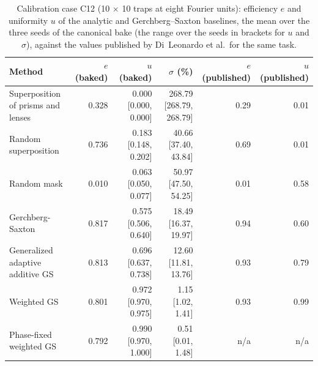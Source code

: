 \begin{table}[t]\centering\footnotesize
\caption{Calibration case C12 (10 $\times$ 10 traps at eight Fourier units): efficiency $e$ and uniformity $u$ of the analytic and Gerchberg--Saxton baselines, the mean over the three seeds of the canonical bake (the range over the seeds in brackets for $u$ and $\sigma$), against the values published by Di~Leonardo et al.\ for the same task.}\label{tab:calibration}
\begin{tabular}{@{}>{\raggedright\arraybackslash}p{} r r r r r@{}}\toprule Method & $e$ (baked) & $u$ (baked) & $\sigma$ (\%) & $e$ (published) & $u$ (published)\\\midrule
Superposition of prisms and lenses & 0.328 & 0.000 [0.000, 0.000] & 268.79 [268.79, 268.79] & 0.29 & 0.01\\
Random superposition & 0.736 & 0.183 [0.148, 0.202] & 40.66 [37.40, 43.84] & 0.69 & 0.01\\
Random mask & 0.010 & 0.063 [0.050, 0.077] & 50.97 [47.50, 54.25] & 0.01 & 0.58\\
Gerchberg-Saxton & 0.817 & 0.575 [0.506, 0.640] & 18.49 [16.37, 19.97] & 0.94 & 0.60\\
Generalized adaptive additive GS & 0.813 & 0.696 [0.637, 0.738] & 12.60 [11.81, 13.76] & 0.93 & 0.79\\
Weighted GS & 0.801 & 0.972 [0.970, 0.975] & 1.15 [1.02, 1.41] & 0.93 & 0.99\\
Phase-fixed weighted GS & 0.792 & 0.990 [0.970, 1.000] & 0.51 [0.01, 1.48] & n/a & n/a\\
\bottomrule\end{tabular}\end{table}
